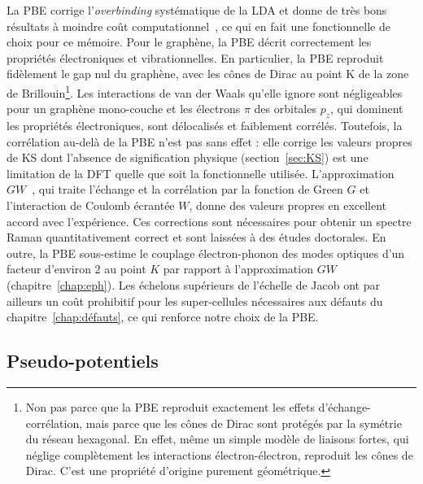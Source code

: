 La PBE corrige l'\textit{overbinding} systématique de la LDA et donne de très bons résultats à moindre coût computationnel~\cite{kurthMolecularSolidstateTests1999,mounetFirstprinciplesDeterminationStructural2005a}, ce qui en fait une fonctionnelle de choix pour ce mémoire. Pour le graphène, la PBE décrit correctement les propriétés électroniques et vibrationnelles. En particulier, la PBE reproduit fidèlement le gap nul du graphène, avec les cônes de Dirac au point K de la zone de Brillouin\footnote{Non pas parce que la PBE reproduit exactement les effets d'échange-corrélation, mais parce que les cônes de Dirac sont protégés par la symétrie du réseau hexagonal. En effet, même un simple modèle de liaisons fortes, qui néglige complètement les interactions électron-électron, reproduit les cônes de Dirac. C'est une propriété d'origine purement géométrique.}. Les interactions de van der Waals qu'elle ignore sont négligeables pour un graphène mono-couche et les électrons $\pi$ des orbitales $p_z$, qui dominent les propriétés électroniques, sont délocalisés et faiblement corrélés. Toutefois, la corrélation au-delà de la PBE n'est pas sans effet : elle corrige les valeurs propres de KS dont l'absence de signification physique (section~\ref{sec:KS}) est une limitation de la DFT quelle que soit la fonctionnelle utilisée. L'approximation $GW$~\cite{hedinNewMethodCalculating1965,hybertsenElectronCorrelationSemiconductors1986}, qui traite l'échange et la corrélation par la fonction de Green $G$ et l'interaction de Coulomb écrantée $W$, donne des valeurs propres en excellent accord avec l'expérience. Ces corrections sont nécessaires pour obtenir un spectre Raman quantitativement correct et sont laissées à des études doctorales. En outre, la PBE sous-estime le couplage électron-phonon des modes optiques d'un facteur d'environ 2 au point $K$ par rapport à l'approximation $GW$~\cite{lazzeriImpactElectronelectronCorrelation2008} (chapitre~\ref{chap:eph}). Les échelons supérieurs de l'échelle de Jacob ont par ailleurs un coût prohibitif pour les super-cellules nécessaires aux défauts du chapitre~\ref{chap:défauts}, ce qui renforce notre choix de la PBE.


\subsection{Pseudo-potentiels}\label{sec:PP}

